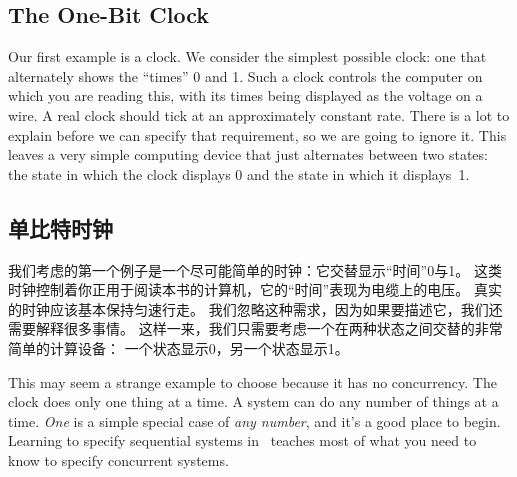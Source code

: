 \begin{en}
\newpage
 \vspace{-\baselineskip}%
\section{The One-Bit Clock}

Our first example is a clock.  We consider the simplest possible
clock: one that alternately shows the ``times'' 0 and 1.  Such a clock
controls the computer on which you are reading this, with its times
being displayed as the voltage on a wire.  A real clock should tick at
an approximately constant rate.  There is a lot to explain before we
can specify that requirement, so we are going to ignore it.  This
leaves a very simple computing device that just alternates between two
states: the state in which the clock displays 0 and the state in which
it displays~1.
\end{en}

\begin{ch}
\newpage
 \vspace{-\baselineskip}%
\section{单比特时钟}

我们考虑的第一个例子是一个尽可能简单的时钟：它交替显示``时间''0与1。
这类时钟控制着你正用于阅读本书的计算机，它的``时间''表现为电缆上的电压。
真实的时钟应该基本保持匀速行走。
我们忽略这种需求，因为如果要描述它，我们还需要解释很多事情。
这样一来，我们只需要考虑一个在两种状态之间交替的非常简单的计算设备：
一个状态显示0，另一个状态显示1。
\end{ch}

\begin{en}
This may seem a strange example to choose because it has no
concurrency.  The clock does only one thing at a time.  A system can
do any number of things at a time.  \emph{One} is a simple special
case of \emph{any number}, and it's a good place to begin.  Learning
to specify sequential systems in \tlaplus\ teaches most of what you
need to know to specify concurrent systems.
\end{en}

